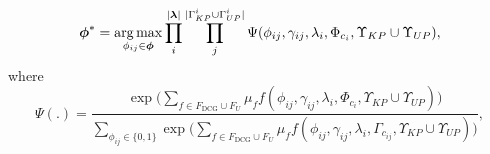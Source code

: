 \begin{equation}
\boldsymbol{\phi}^* = \operatorname*{\arg\max}_{\phi_{ij} \in \boldsymbol{\phi}} \prod_{i}^{|\boldsymbol\lambda|} \prod_{j}^{|\Gamma^i_{KP} \cup \Gamma^i_{UP}|} \Psi(\phi_{ij},\gamma_{ij},\lambda_i, \Phi_{c_{i}},\Upsilon_{KP} \cup \Upsilon_{UP}),
\label{eq:dcg_upup_llm1}
\end{equation}
where 
\begin{equation}
\Psi(.) = \frac{\exp \Big( \sum\limits_{f \in F_{\text{DCG}} \cup F_U} \mu_f f(\phi_{ij},\gamma_{ij},\lambda_i,\Phi_{c_{i}},\Upsilon_{KP} \cup \Upsilon_{UP}) \Big)}{\sum\limits_{\phi_{ij} \in \{0,1\}}\exp \Big( \sum\limits_{f \in F_{\text{DCG}} \cup F_U} \mu_f f(\phi_{ij},\gamma_{ij},\lambda_i,\Gamma_{c_{ij}},\Upsilon_{KP} \cup \Upsilon_{UP}) \Big)},
\label{eq:dcg_upup_llm2}
\end{equation}
%
